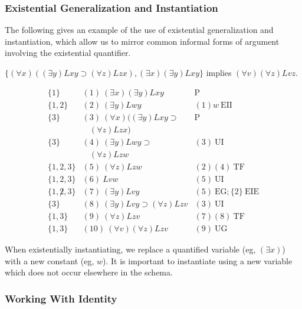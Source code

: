 \subsubsection*{Existential Generalization and Instantiation}
The following gives an example of the use of existential generalization and instantiation, which allow us to  mirror common informal forms of argument involving the existential quantifier. 
\begin{center}
$\{(\forall x) ((\exists y) Lxy \supset (\forall z) Lzx), (\exists x)(\exists
y) Lxy \}$ implies $(\forall v)(\forall z) Lvz.$
\end{center}
\[
\begin{array}{lll}
\{1\}   & (1)\  (\exists x)(\exists y) Lxy &  \mathrm{P}\\
\{1,2\}   & (2)\ (\exists y) Lwy  & (1)w\ \mathrm{EII}\\
\{3\}   & (3)\ (\forall x) ((\exists y) Lxy \supset   & 
\mathrm{P}\\
  &\ \ \ \  (\forall z) Lzx)  & \\
\{3\}   & (4)\ (\exists y) Lwy \supset   & (3)\ \mathrm{UI}\\
  &\ \ \ \ (\forall z) Lzw & \\
\{1,2,3\}   & (5)\ (\forall z) Lzw  & (2)(4)\ \mathrm{TF}\\
\{1,2,3\}   & (6)\ Lvw  & (5)\ \mathrm{UI}\\
\{1,\not 2,3\}   & (7)\ (\exists y) Lvy  & (5)\ \mathrm{EG};\{2\}\
\mathrm{EIE}\\ 
\{3\}   & (8)\ (\exists y) Lvy \supset (\forall z) Lzv  & (3)\ \mathrm{UI}\\
\{1,3\}   & (9)\  (\forall z) Lzv & (7)(8)\ \mathrm{TF}\\
\{1,3\}   & (10)\  (\forall v)(\forall z) Lzv & (9)\ \mathrm{UG}
\end{array}
\]

When existentially instantiating, we replace a quantified variable (eg, $(\exists x)$) with a new constant (eg, $w$). It is important to instantiate using a new variable which does not occur elsewhere in the schema. 

\subsubsection*{Working With Identity}

